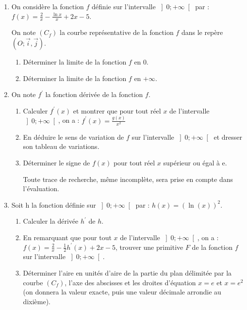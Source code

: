 \begin{enumerate}
     En utilisant une calculatrice, on a obtenu $\alpha  \approx 1,19$.
     \par
     Dresser le tableau donnant le signe de la fonction $g$ sur l'intervalle $\left]0; +\infty \right[$.
     \item
     On considère la fonction $f$ définie sur l'intervalle $\left]0; +\infty \right[$ par : $f\left(x\right)=\frac{2}{x}-\frac{\ln x}{x}+2x-5$.
     \par
     On note $\left(C_{f}\right)$ la courbe représentative de la fonction $f$ dans le repère $\left(O; \vec{i}, \vec{j}\right)$.
     \begin{enumerate}[label=\alph*.]
          \item
          Déterminer la limite de la fonction $f$ en 0.
          \item
          Déterminer la limite de la fonction $f$ en $+\infty $.
     \end{enumerate}
     \item
     On note $f^{\prime}$ la fonction dérivée de la fonction $f$.
     \begin{enumerate}[label=\alph*.]
          \item
          Calculer $f^{\prime}\left(x\right)$ et montrer que pour tout réel $x$ de l'intervalle $\left]0; +\infty \right[$, on a : $f^{\prime}\left(x\right)=\frac{g\left(x\right)}{x^{2}}$
          \item
          En déduire le sens de variation de $f$ sur l'intervalle  $\left]0; +\infty \right[$ et dresser son tableau de variations.
          \item
          Déterminer le signe de $f\left(x\right)$ pour tout réel  $x$ supérieur ou égal à e.
          \par
          Toute trace de recherche, même incomplète, sera prise en compte dans l'évaluation.
     \end{enumerate}
     \item
     Soit h la fonction définie sur $\left]0; +\infty \right[$ par : $h\left(x\right)=\left(\ln\left(x\right)\right)^{2}$.
     \begin{enumerate}[label=\alph*.]
          \item
          Calculer la dérivée $h^{\prime}$ de $h$.
          \item
          En remarquant que pour tout $x$ de l'intervalle $\left]0; +\infty \right[$, on a : $f\left(x\right)=\frac{2}{x}-\frac{1}{2} h^{\prime}\left(x\right)+2x -5 $, trouver une primitive $F$ de la fonction $f$ sur l'intervalle  $\left]0; +\infty \right[$.
          \item
          Déterminer l'aire en unités d'aire de la partie du plan délimitée par la courbe $\left(C_{f}\right)$, l'axe des abscisses et les droites d'équation $x=e$ et $x=e^{2}$ (on donnera la valeur exacte, puis une valeur décimale arrondie au dixième). 
     \end{enumerate}
\end{enumerate}
